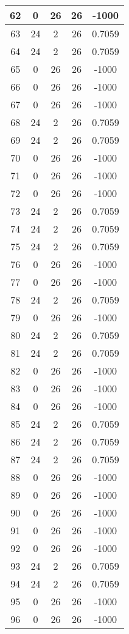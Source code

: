 \documentclass[letterpaper, 12pt]{article}
\begin{document}
\begin{longtable}{|c|c|c|c|c|}
\hline
62 & 0 & 26 & 26 & -1000 \\
\hline
63 & 24 & 2 & 26 & 0.7059 \\
\hline
64 & 24 & 2 & 26 & 0.7059 \\
\hline
65 & 0 & 26 & 26 & -1000 \\
\hline
66 & 0 & 26 & 26 & -1000 \\
\hline
67 & 0 & 26 & 26 & -1000 \\
\hline
68 & 24 & 2 & 26 & 0.7059 \\
\hline
69 & 24 & 2 & 26 & 0.7059 \\
\hline
70 & 0 & 26 & 26 & -1000 \\
\hline
71 & 0 & 26 & 26 & -1000 \\
\hline
72 & 0 & 26 & 26 & -1000 \\
\hline
73 & 24 & 2 & 26 & 0.7059 \\
\hline
74 & 24 & 2 & 26 & 0.7059 \\
\hline
75 & 24 & 2 & 26 & 0.7059 \\
\hline
76 & 0 & 26 & 26 & -1000 \\
\hline
77 & 0 & 26 & 26 & -1000 \\
\hline
78 & 24 & 2 & 26 & 0.7059 \\
\hline
79 & 0 & 26 & 26 & -1000 \\
\hline
80 & 24 & 2 & 26 & 0.7059 \\
\hline
81 & 24 & 2 & 26 & 0.7059 \\
\hline
82 & 0 & 26 & 26 & -1000 \\
\hline
83 & 0 & 26 & 26 & -1000 \\
\hline
84 & 0 & 26 & 26 & -1000 \\
\hline
85 & 24 & 2 & 26 & 0.7059 \\
\hline
86 & 24 & 2 & 26 & 0.7059 \\
\hline
87 & 24 & 2 & 26 & 0.7059 \\
\hline
88 & 0 & 26 & 26 & -1000 \\
\hline
89 & 0 & 26 & 26 & -1000 \\
\hline
90 & 0 & 26 & 26 & -1000 \\
\hline
91 & 0 & 26 & 26 & -1000 \\
\hline
92 & 0 & 26 & 26 & -1000 \\
\hline
93 & 24 & 2 & 26 & 0.7059 \\
\hline
94 & 24 & 2 & 26 & 0.7059 \\
\hline
95 & 0 & 26 & 26 & -1000 \\
\hline
96 & 0 & 26 & 26 & -1000 \\

\end{longtable}
\end{document}
